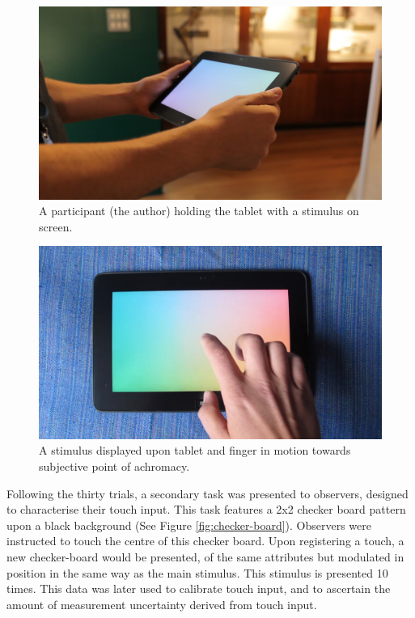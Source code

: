 \begin{figure}[hbtp]
\includegraphics[max width=\textwidth]{figs/tablet/MVI_3213-1.jpg} %
\caption{A participant (the author) holding the tablet with a stimulus on screen.}
\label{fig:grant_demo}
\end{figure}

\begin{figure}[hbtp]
\includegraphics[max width=\textwidth]{figs/tablet/MVI_3889-4.jpg} %
\caption{A stimulus displayed upon tablet and finger in motion towards subjective point of achromacy.}
\label{fig:finger}
\end{figure}

Following the thirty trials, a secondary task was presented to observers, designed to characterise their touch input. This task features a 2x2 checker board pattern upon a black background (See Figure \ref{fig:checker-board}). Observers were instructed to touch the centre of this checker board. Upon registering a touch, a new checker-board would be presented, of the same attributes but modulated in position in the same way as the main stimulus. This stimulus is presented 10 times. This data was later used to calibrate touch input, and to ascertain the amount of measurement uncertainty derived from touch input. 

